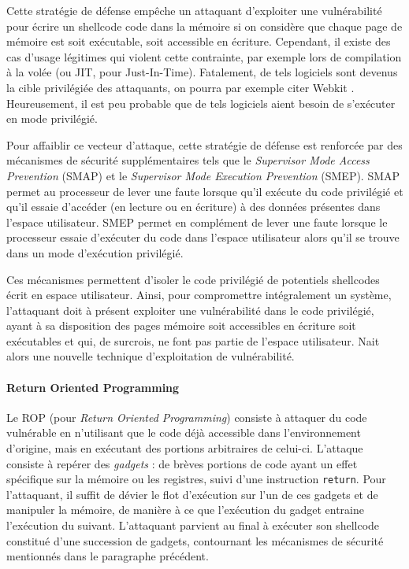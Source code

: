 Cette stratégie de défense empêche un attaquant d'exploiter une vulnérabilité pour écrire un shellcode code dans la mémoire si on considère que chaque page de mémoire est soit exécutable, soit accessible en écriture. Cependant, il existe des cas d'usage légitimes qui violent cette contrainte, par exemple lors de compilation à la volée (ou JIT, pour Just-In-Time). Fatalement, de tels logiciels sont devenus la cible privilégiée des attaquants, on pourra par exemple citer Webkit \cite{webkitexploit}.
Heureusement, il est peu probable que de tels logiciels aient besoin de s'exécuter en mode privilégié. 

Pour affaiblir ce vecteur d'attaque, cette stratégie de défense est renforcée par des mécanismes de sécurité supplémentaires tels que le \emph{Supervisor Mode Access Prevention} (SMAP) et le \emph{Supervisor Mode Execution Prevention} (SMEP). SMAP permet au processeur de lever une faute lorsque qu'il exécute du code privilégié et qu'il essaie d'accéder (en lecture ou en écriture) à des données présentes dans l'espace utilisateur. SMEP permet en complément de lever une faute lorsque le processeur essaie d'exécuter du code dans l'espace utilisateur alors qu'il se trouve dans un mode d'exécution privilégié.

Ces mécanismes permettent d'isoler le code privilégié de potentiels shellcodes écrit en espace utilisateur. Ainsi, pour compromettre intégralement un système, l'attaquant doit à présent exploiter une vulnérabilité dans le code privilégié, ayant à sa disposition des pages mémoire soit accessibles en écriture soit exécutables et qui, de surcrois, ne font pas partie de l'espace utilisateur.
Nait alors une nouvelle technique d'exploitation de vulnérabilité. 

\paragraph{Return Oriented Programming}
\label{ROP}
Le ROP (pour \emph{Return Oriented Programming}) consiste à attaquer du code vulnérable en n'utilisant que le code déjà accessible dans l'environnement d'origine, mais en exécutant des portions arbitraires de celui-ci. L'attaque consiste à repérer des \emph{gadgets} : de brèves portions de code ayant un effet spécifique sur la mémoire ou les registres, suivi d'une instruction \texttt{return}. Pour l'attaquant, il suffit de dévier le flot d'exécution sur l'un de ces gadgets et de manipuler la mémoire, de manière à ce que l'exécution du gadget entraine l'exécution du suivant. L'attaquant parvient au final à exécuter son shellcode constitué d'une succession de gadgets, contournant les mécanismes de sécurité mentionnés dans le paragraphe précédent.\\

